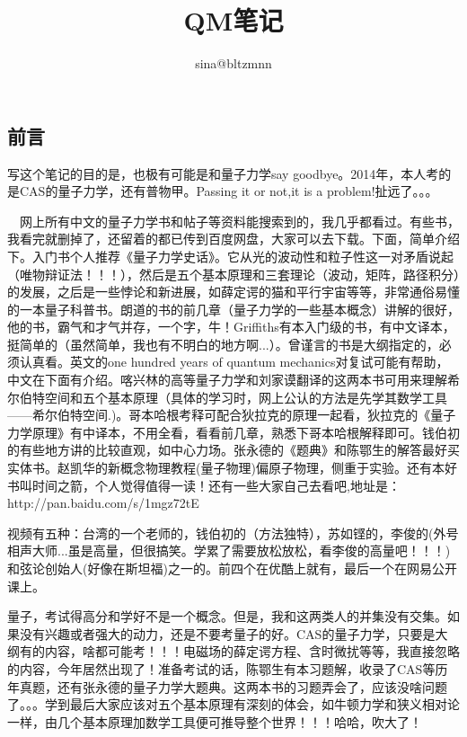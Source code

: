 \documentclass[13pt,a4paper]{article}
\begin{document}
\begin{CJK}{UTF8}{song} 
\LARGE
\cfoot{\thepage}
\title{QM笔记}
\author{sina@bltzmnn}
\date{}
\maketitle
\newpage

\section{前言}
  写这个笔记的目的是，也极有可能是和量子力学say goodbye。2014年，本人考的是CAS的量子力学，还有普物甲。Passing it or not,it is a problem!扯远了。。。 
  
 \ \  网上所有中文的量子力学书和帖子等资料能搜索到的，我几乎都看过。有些书，我看完就删掉了，还留着的都已传到百度网盘，大家可以去下载。下面，简单介绍下。入门书个人推荐《量子力学史话》。它从光的波动性和粒子性这一对矛盾说起（唯物辩证法！！！），然后是五个基本原理和三套理论（波动，矩阵，路径积分）的发展，之后是一些悖论和新进展，如薛定谔的猫和平行宇宙等等，非常通俗易懂的一本量子科普书。朗道的书的前几章（量子力学的一些基本概念）讲解的很好，他的书，霸气和才气并存，一个字，牛！Griffiths有本入门级的书，有中文译本，挺简单的（虽然简单，我也有不明白的地方啊...）。曾谨言的书是大纲指定的，必须认真看。英文的one hundred years of quantum mechanics对复试可能有帮助，中文在下面有介绍。喀兴林的高等量子力学和刘家谟翻译的这两本书可用来理解希尔伯特空间和五个基本原理（具体的学习时，网上公认的方法是先学其数学工具——希尔伯特空间.)。哥本哈根考释可配合狄拉克的原理一起看，狄拉克的《量子力学原理》有中译本，不用全看，看看前几章，熟悉下哥本哈根解释即可。钱伯初的有些地方讲的比较直观，如中心力场。张永德的《题典》和陈鄂生的解答最好买实体书。赵凯华的新概念物理教程(量子物理)偏原子物理，侧重于实验。还有本好书叫时间之箭，个人觉得值得一读！还有一些大家自己去看吧,地址是：http://pan.baidu.com/s/1mgz72tE
  
  视频有五种：台湾的一个老师的，钱伯初的（方法独特），苏如铿的，李俊的(外号相声大师...虽是高量，但很搞笑。学累了需要放松放松，看李俊的高量吧！！！)和弦论创始人(好像在斯坦福)之一的。前四个在优酷上就有，最后一个在网易公开课上。
  
  量子，考试得高分和学好不是一个概念。但是，我和这两类人的并集没有交集。如果没有兴趣或者强大的动力，还是不要考量子的好。CAS的量子力学，只要是大纲有的内容，啥都可能考！！！电磁场的薛定谔方程、含时微扰等等，我直接忽略的内容，今年居然出现了！准备考试的话，陈鄂生有本习题解，收录了CAS等历年真题，还有张永德的量子力学大题典。这两本书的习题弄会了，应该没啥问题了。。。学到最后大家应该对五个基本原理有深刻的体会，如牛顿力学和狭义相对论一样，由几个基本原理加数学工具便可推导整个世界！！！哈哈，吹大了！
  

\end{CJK}
\end{document}
